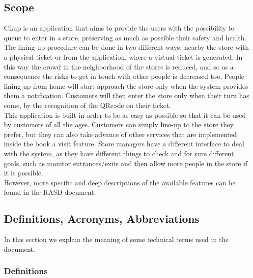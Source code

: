 \documentclass[]{article}
\begin{document}
	
	\subsection{Scope}
	
	\begin{paragraph}
		\newline
		CLup is an application that aims to provide the users with the possibility to queue to enter in a store, preserving as much as possible their safety and health. The lining up procedure can be done in two different ways: nearby the store with a physical ticket or from the application, where a virtual ticket is generated. In this way the crowd in the neighborhood of the stores is reduced, and so as a consequence the risks to get in touch with other people is decreased too. People lining up from home will start approach the store only when the system provides them a notification. Customers will then enter the store only when their turn has come, by the recognition of the QRcode on their ticket.\\
		This application is built in order to be as easy as possible so that it can be used by customers of all the ages. Customers can simply line-up to the store they prefer, but they can also take advance of other services that are implemented inside the book a visit feature. Store managers have a different interface to deal with the system, as they have different things to check and for sure different goals, such as monitor entrances/exits and then allow more people in the store if it is possible. \\
		However, more specific and deep descriptions of the available features can be found in the RASD document.\\
		
	\end{paragraph}

	\subsection{Definitions, Acronyms, Abbreviations}
	
		In this section we explain the meaning of some technical terms used in the document.
		
		
		\subsubsection{Definitions}
		
			\medskip
			
\end{document}
